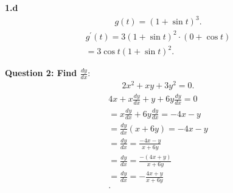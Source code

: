 \documentclass{report}
\begin{document}
    \pagebreak \bigbreak \noindent
    \begin{mdframed}
        \textbf{1.d}
        \begin{align*}
            g(t) = (1+\sin{t})^{3}
        .\end{align*}
        \bigbreak \noindent 
        \begin{align*}
            g^{\prime}(t) = 3(1+\sin{t})^{2} \cdot (0+\cos{t}) \\
            = \boxed{3\cos{t}(1+\sin{t})^{2}}
        .\end{align*}
    \end{mdframed}

    \bigbreak \noindent 
    \begin{mdframed}
        \textbf{Question 2: Find $\frac{dy}{dx}$}:
        \begin{align*}
            2x^{2}+xy+3y^{2} = 0
        .\end{align*}
        \bigbreak \noindent 
        \begin{align*}
            4x+x\frac{dy}{dx} + y + 6y \frac{dy}{dx} = 0 \\ 
            = x \frac{dy}{dx} + 6y \frac{dy}{dx} = -4x-y \\
            = \frac{dy}{dx}(x+6y) = -4x -y \\
            = \frac{dy}{dx} = \frac{-4x-y}{x+6y} \\
            = \frac{dy}{dx} = \frac{-(4x+y)}{x+6y} \\
            = \boxed{\frac{dy}{dx} = -\frac{4x+y}{x+6y}} \\
        .\end{align*}
    \end{mdframed}
\end{document}
